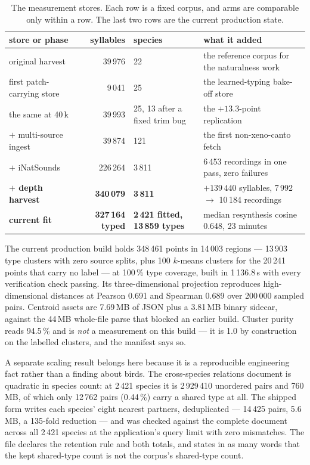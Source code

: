 \documentclass[10pt,twocolumn,a4paper]{article}
\begin{document}
\begin{table}[t]
\centering
\small
\caption{The measurement stores. Each row is a fixed corpus, and arms are comparable only
within a row. The last two rows are the current production state.}
\label{tab:stores}
\begin{tabular}{L{4.8cm} r L{3.0cm} L{4.4cm}}
\toprule
store or phase & syllables & species & what it added \\
\midrule
original harvest & 39\,976 & 22 & the reference corpus for the naturalness work \\
first patch-carrying store & 9\,041 & 25 & the learned-typing bake-off store \\
the same at 40\,k & 39\,993 & 25, 13 after a fixed trim bug & the $+13.3$-point replication \\
$+$ multi-source ingest & 39\,874 & 121 & the first non-xeno-canto fetch \\
$+$ iNatSounds & 226\,264 & 3\,811 & 6\,453 recordings in one pass, zero failures \\
\textbf{$+$ depth harvest} & \textbf{340\,079} & \textbf{3\,811} & $+139\,440$ syllables, 7\,992 $\to$ 10\,184 recordings \\
\textbf{current fit} & \textbf{327\,164 typed} & \textbf{2\,421 fitted, 13\,859 types} & median resynthesis cosine 0.648, 23 minutes \\
\bottomrule
\end{tabular}
\end{table}

The current production build holds 348\,461 points in 14\,003 regions --- 13\,903 type
clusters with zero source splits, plus 100 $k$-means clusters for the 20\,241 points that
carry no label --- at 100\,\% type coverage, built in 1\,136.8\,s with every verification
check passing. Its three-dimensional projection reproduces high-dimensional distances at
Pearson 0.691 and Spearman 0.689 over 200\,000 sampled pairs. Centroid assets are 7.69\,MB of
JSON plus a 3.81\,MB binary sidecar, against the 44\,MB whole-file parse that blocked an
earlier build. Cluster purity reads 94.5\,\% and is \emph{not} a measurement on this build ---
it is 1.0 by construction on the labelled clusters, and the manifest says so.

A separate scaling result belongs here because it is a reproducible engineering fact rather
than a finding about birds. The cross-species relations document is quadratic in species
count: at 2\,421 species it is 2\,929\,410 unordered pairs and 760\,MB, of which only 12\,762
pairs (0.44\,\%) carry a shared type at all. The shipped form writes each species' eight
nearest partners, deduplicated --- 14\,425 pairs, 5.6\,MB, a 135-fold reduction --- and was
checked against the complete document across all 2\,421 species at the application's query
limit with zero mismatches. The file declares the retention rule and both totals, and states
in as many words that the kept shared-type count is not the corpus's shared-type count.
\end{document}
